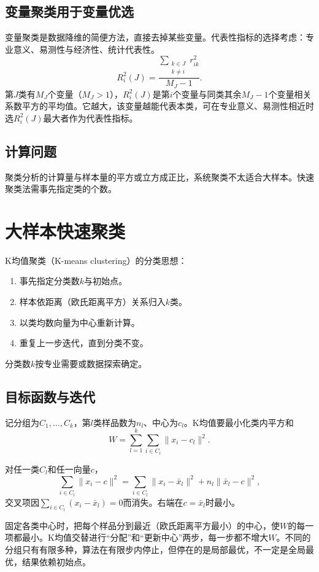 \subsection{变量聚类用于变量优选}
变量聚类是数据降维的简便方法，直接去掉某些变量。代表性指标的选择考虑：专业意义、易测性与经济性、统计代表性。
\begin{equation}
R_i^2(J)=\frac{\displaystyle\sum_{\substack{k\in J\\k\ne i}}r_{ik}^2}{M_J-1}.
\end{equation}
第$J$类有$M_J$个变量（$M_J>1$），$R_i^2(J)$是第$i$个变量与同类其余$M_J-1$个变量相关系数平方的平均值。它越大，该变量越能代表本类，可在专业意义、易测性相近时选$R_i^2(J)$最大者作为代表性指标。
\subsection{计算问题}
聚类分析的计算量与样本量的平方或立方成正比，系统聚类不太适合大样本。快速聚类法需事先指定类的个数。
\section{大样本快速聚类}
K均值聚类（K-means clustering）的分类思想：
\begin{enumerate}
\item 事先指定分类数$k$与初始点。
\item 样本依距离（欧氏距离平方）关系归入$k$类。
\item 以类均数向量为中心重新计算。
\item 重复上一步迭代，直到分类不变。
\end{enumerate}
分类数$k$按专业需要或数据探索确定。
\subsection{目标函数与迭代}
记分组为$C_1,\ldots,C_k$，第$l$类样品数为$n_l$、中心为$c_l$。K均值要最小化类内平方和
\[
W=\sum_{l=1}^k\sum_{i\in C_l}\|x_i-c_l\|^2.
\]
\begin{zm}
对任一类$C_l$和任一向量$c$，
\[
\sum_{i\in C_l}\|x_i-c\|^2=\sum_{i\in C_l}\|x_i-\bar x_l\|^2+n_l\|\bar x_l-c\|^2,
\]
交叉项因$\sum_{i\in C_l}(x_i-\bar x_l)=0$而消失。右端在$c=\bar x_l$时最小。
\end{zm}
固定各类中心时，把每个样品分到最近（欧氏距离平方最小）的中心，使$W$的每一项都最小。K均值交替进行“分配”和“更新中心”两步，每一步都不增大$W$。不同的分组只有有限多种，算法在有限步内停止，但停在的是局部最优，不一定是全局最优，结果依赖初始点。

